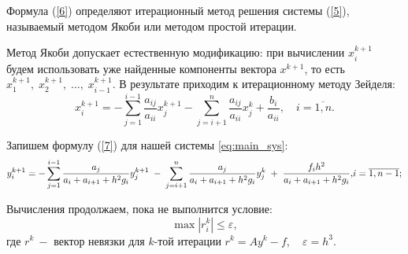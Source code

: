 \documentclass[a4paper,12pt]{article}
\begin{document}
{		Формула (\ref{6}) определяют итерационный метод решения системы (\ref{5}), называемый мето\-дом Якоби или методом простой итерации.
		
		Метод Якоби допускает естественную модификацию: при вычислении $x_i^{k+1}$ 
		будем использовать уже найденные компоненты вектора $x^{k+1}$, то есть $x_1^{k+1},\;x_2^{k+1},\;\dots,\;x_{i-1}^{k+1}$. 
		В результате приходим к итерационному методу Зейделя:
		\begin{equation}
			x_i^{k+1}= - \sum\limits_{j=1}^{i-1} \frac{a_{ij}}{a_{ii}}x_j^{k+1} - \sum\limits_{j=i+1}^n \frac{a_{ij}}{a_{ii}}x_j^k+\frac{b_i}{a_{ii}}, \quad i = \overline{1,n}. 
			\label{7}
		\end{equation}
		
		Запишем формулу (\ref{7}) для нашей системы \eqref{eq:main_sys}:
		\begin{equation}
			y_i^{k+1}=  -\sum\limits_{j=1}^{i-1}\frac{a_j}{a_i+a_{i+1}+h^2 g_i}y_j^{k+1} \; - \;\sum\limits_{j=i+1}^{n}\frac{a_{j}}{a_i+a_{i+1}+h^2 g_i}y_j^k\; +\; \frac{f_i h^2}{a_i+a_{i+1}+h^2 g_i},$$$$
			i=\overline{1, n-1};
			\label{8}
		\end{equation}
		
		Вычисления продолжаем, пока не выполнится условие:
		$$\max\limits |r_i^k| \leq \varepsilon,$$
		где $r^k ~-$ вектор невязки для $k$-той итерации $r^k=Ay^k-f, \quad \varepsilon=h^3.$
		
}
\end{document}
